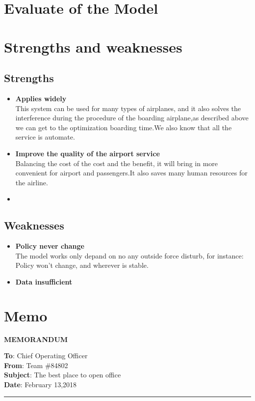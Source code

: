 \documentclass{mcmthesis}
\begin{document}
\section{Evaluate of the Model}

\section{Strengths and weaknesses}


\subsection{Strengths}
\begin{itemize}
\item \textbf{Applies widely}\\
This  system can be used for many types of airplanes, and it also
solves the interference during  the procedure of the boarding
airplane,as described above we can get to the  optimization
boarding time.We also know that all the service is automate.
\item \textbf{Improve the quality of the airport service}\\
Balancing the cost of the cost and the benefit, it will bring in
more convenient  for airport and passengers.It also saves many
human resources for the airline. \item \textbf{}
\end{itemize}
\cite{chicago}
\subsection{Weaknesses}
\begin{itemize}
\item \textbf{Policy never change}\\
The model works only depand on no any outside force disturb, for instance: Policy won't change, and 
wherever is stable.
\item \textbf{Data insufficient}\\

\end{itemize}
\newpage 
\section{Memo}
\begin{center}
\large {\textbf {MEMORANDUM}}
\end{center}
\textbf {To}: Chief Operating Officer \\
\textbf {From}: Team \#84802 \\
\textbf {Subject}: The best place to open office \\
\textbf {Date}: February 13,2018 \\
\noindent\rule[0.25\baselineskip]{\textwidth}{1pt}
\end{document}
